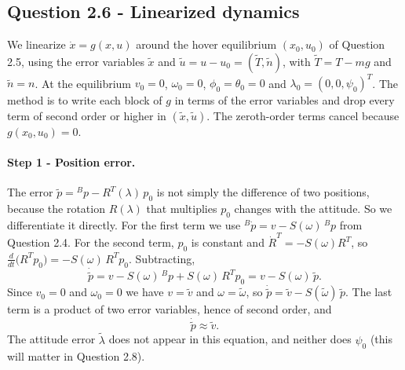 \subsection*{Question 2.6 - Linearized dynamics}

We linearize $\dot x = g(x, u)$ around the hover equilibrium $(x_0, u_0)$ of Question 2.5, using the error variables $\tilde x$ and $\tilde u = u - u_0 = (\tilde T, \tilde n)$, with $\tilde T = T - m g$ and $\tilde n = n$.
At the equilibrium $v_0 = 0$, $\omega_0 = 0$, $\phi_0 = \theta_0 = 0$ and $\lambda_0 = (0, 0, \psi_0)^T$.
The method is to write each block of $g$ in terms of the error variables and drop every term of second order or higher in $(\tilde x, \tilde u)$.
The zeroth-order terms cancel because $g(x_0, u_0) = 0$.

\paragraph{Step 1 - Position error.}
The error $\tilde p = {}^B p - R^T(\lambda)\, p_0$ is not simply the difference of two positions, because the rotation $R(\lambda)$ that multiplies $p_0$ changes with the attitude.
So we differentiate it directly.
For the first term we use ${}^B\dot p = v - S(\omega)\, {}^B p$ from Question 2.4.
For the second term, $p_0$ is constant and $\dot R^T = -S(\omega) R^T$, so $\frac{d}{dt}\big(R^T p_0\big) = -S(\omega)\, R^T p_0$.
Subtracting,
\begin{equation*}
\dot{\tilde p} = v - S(\omega)\, {}^B p + S(\omega)\, R^T p_0 = v - S(\omega)\, \tilde p .
\end{equation*}
Since $v_0 = 0$ and $\omega_0 = 0$ we have $v = \tilde v$ and $\omega = \tilde\omega$, so $\dot{\tilde p} = \tilde v - S(\tilde\omega)\,\tilde p$.
The last term is a product of two error variables, hence of second order, and
\begin{equation*}
\dot{\tilde p} \approx \tilde v .
\end{equation*}
The attitude error $\tilde\lambda$ does not appear in this equation, and neither does $\psi_0$ (this will matter in Question 2.8).

